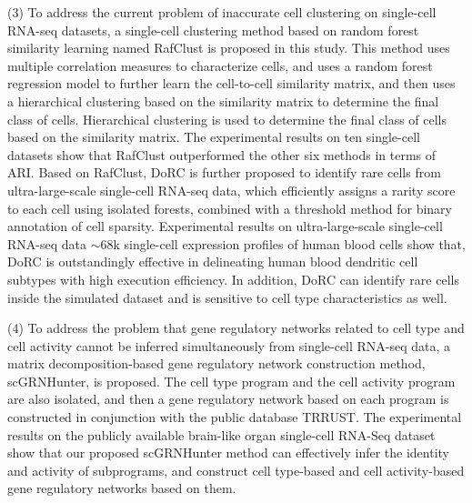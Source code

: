 \begin{abstracten}
(3) To address the current problem of inaccurate cell clustering on single-cell RNA-seq datasets, 
a single-cell clustering method based on random forest similarity learning named RafClust is proposed in this study.  
This method uses multiple correlation measures to characterize cells, and uses a random forest regression model to further learn the cell-to-cell similarity matrix, and then uses a hierarchical clustering based on the similarity matrix to determine the final class of cells. 
Hierarchical clustering is used to determine the final class of cells based on the similarity matrix. 
The experimental results on ten single-cell datasets show that RafClust outperformed the other six methods in terms of ARI. 
Based on RafClust, DoRC is further proposed to identify rare cells from ultra-large-scale single-cell RNA-seq data, 
which efficiently assigns a rarity score to each cell using isolated forests, combined with a threshold method for binary annotation of cell sparsity. 
Experimental results on ultra-large-scale single-cell RNA-seq data ${\sim}68$k single-cell expression profiles of human blood cells show that,
DoRC is outstandingly effective in delineating human blood dendritic cell subtypes with high execution efficiency. 
In addition, DoRC can identify rare cells inside the simulated dataset and is sensitive to cell type characteristics as well.

(4) To address the problem that gene regulatory networks related to cell type and cell activity cannot be inferred simultaneously from single-cell RNA-seq data, 
a matrix decomposition-based gene regulatory network construction method, scGRNHunter, is proposed. 
The cell type program and the cell activity program are also isolated, and then a gene regulatory network based on each program is constructed in conjunction with the public database TRRUST. 
The experimental results on the publicly available brain-like organ single-cell RNA-Seq dataset show that our proposed scGRNHunter method can effectively infer the identity and activity of subprograms, 
and construct cell type-based and cell activity-based gene regulatory networks based on them.

\end{abstracten}